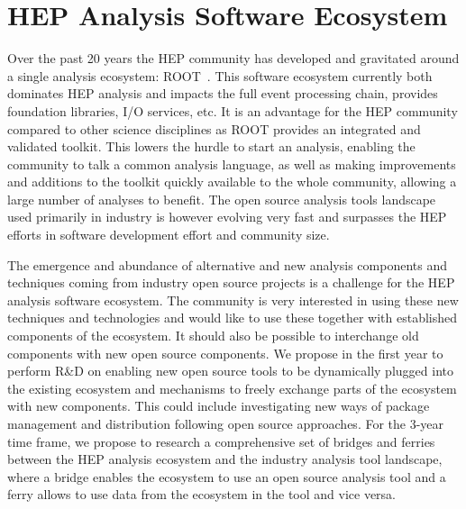 \documentclass[12pt,a4paper]{article}
\begin{document}
\section{HEP Analysis Software Ecosystem}

Over the past 20 years the HEP community has developed and gravitated around a single analysis ecosystem: ROOT~\cite{Brun1996}. This software ecosystem currently both dominates HEP analysis and impacts the full event processing chain, provides foundation libraries, I/O services, etc. It is an advantage for the HEP community compared to other science disciplines as ROOT provides an integrated and validated toolkit. This lowers the hurdle to start an analysis, enabling the community to talk a common analysis language, as well as making improvements and additions to the toolkit quickly available to the whole community, allowing a large number of analyses to benefit. The open source analysis tools landscape used primarily in industry is however evolving very fast and surpasses the HEP efforts in software development effort and community size. 

The emergence and abundance of alternative and new analysis components and techniques coming from industry open source projects is a challenge for the HEP analysis software ecosystem. The community is very interested in using these new techniques and technologies and would like to use these together with established components of the ecosystem. It should  also be possible to interchange old components with new open source components. We propose in the first year to perform R\&D on enabling new open source tools to be dynamically plugged into the existing ecosystem and mechanisms to freely exchange parts of the ecosystem with new components. This could include investigating new ways of package management and distribution following open source approaches. For the 3-year time frame, we propose to research a comprehensive set of bridges and ferries between the HEP analysis ecosystem and the industry analysis tool landscape, where a bridge enables the ecosystem to use an open source analysis tool and a ferry allows to use data from the ecosystem in the tool and vice versa.
\end{document}
